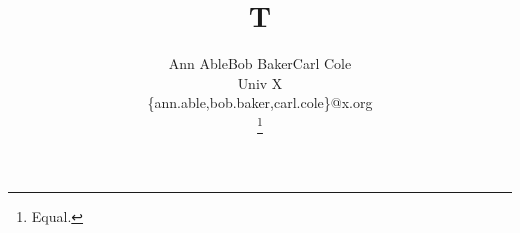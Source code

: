 \documentclass{eptcs}
\RequirePackage{array}
\newenvironment{authors}[1]%
  {\begingroup
   \renewcommand\institute[1]{\\\multicolumn{#1}{c}{\footnotesize ##1}}%
   \renewcommand\email[1]{\\\multicolumn{#1}{c}{\footnotesize\ttfamily ##1}}%
   \begin{tabular}[t]{*{#1}{c}}}
  {\end{tabular}\endgroup}
\title{T}
\author{
  \begin{authors}{3}
  Ann Able & Bob Baker & Carl Cole
  \institute{Univ X}
  \email{\{ann.able,bob.baker,carl.cole\}@x.org}
  \end{authors}\thanks{Equal.}
}

\maketitle
Text.

